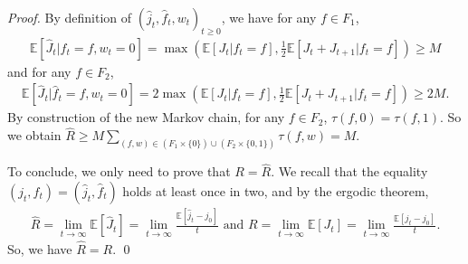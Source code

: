 \documentclass[10pt,a4paper]{amsart}
\newcommand{\esp}[1]{\mathbb{E}\left[ #1 \right]}
\begin{document}
\begin{proof}
By definition of $(\hat{j}_t,\hat{f}_t,w_t)_{t\geq 0}$, we have for any $f\in F_1$,
\begin{align*}
    \esp{\hat{J}_t | \hat{f}_t = f, w_t=0} = \max \left( \esp{J_t | f_t = f},\frac{1}{2} \esp{J_t + J_{t+1} | f_t = f} \right) \geq M
\end{align*}
and for any $f \in F_2$, 
\begin{align*}
     \esp{\hat{J}_{t} | \hat{f}_t = f, w_t=0} = 2\max \left( \esp{J_t | f_t = f}, \frac{1}{2} \esp{J_t + J_{t+1} | f_t = f} \right) \geq 2M.
\end{align*} 
By construction of the new Markov chain, for any $f \in F_2$, $\tau(f,0) = \tau(f,1)$. So we obtain 
$\hat{R} \geq M \sum_{(f,w) \in (F_1\times\{0\}) \cup (F_2 \times \{0,1\})} \tau(f,w) = M$.

To conclude, we only need to prove that $R = \hat{R}$. We recall that the equality $(j_t,f_t) = (\hat{j}_t,\hat{f}_t)$ holds at least once in two, and by the ergodic theorem,
\begin{align*}
    \hat{R} = \lim_{t \to \infty} \esp{\hat{J}_t} = \lim_{t \to \infty} \frac{\esp{\hat{j}_t-j_0}}{t} \text{ and } R = \lim_{t \to \infty} \esp{J_t} = \lim_{t \to \infty} \frac{\esp{j_t-j_0}}{t}.
\end{align*}
So, we have $\hat{R} = R$. \qed
\end{proof}
\end{document}
